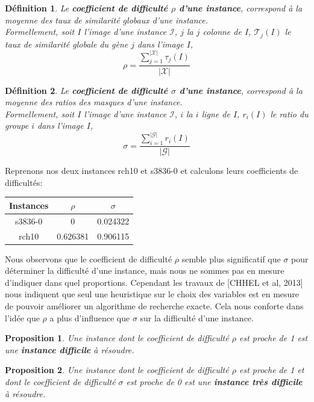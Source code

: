 \documentclass[a4paper,10pt]{article}
\newtheorem{definition}{Définition}
\newtheorem{proposition}{Proposition}
\begin{document}
\begin{definition}
Le \textbf{coefficient de difficulté $\rho$ d'une instance}, correspond à la moyenne des taux de similarité globaux d'une instance.\\
Formellement, soit $I$ l'image d'une instance $\mathcal{I}$, $j$ la $j$ colonne de $I$, $\mathcal{T}_j(I)$ le taux de similarité globale du gène $j$ dans l'image $I$,
$$ \rho=\frac{\sum_{j=1}^{|\mathcal{X}|}\tau_j(I)}{|\mathcal{X}|} $$
\end{definition}

\begin{definition}
Le \textbf{coefficient de difficulté $\sigma$ d'une instance}, correspond à la moyenne des ratios des masques d'une instance.\\
Formellement, soit $I$ l'image d'une instance $\mathcal{I}$, $i$ la $i$ ligne de $I$, $r_i(I)$ le ratio du groupe $i$ dans l'image $I$,
$$ \sigma=\frac{\sum_{i=1}^{|\mathcal{G}|}r_i(I)} {|\mathcal{G}|} $$
\end{definition}

Reprenons nos deux instances rch10 et s3836-0 et calculons leurs coefficients de difficultés:

\begin{center}
\begin{tabular}{|c|c|c|}
\hline 
Instances & $\rho$ & $\sigma$ \\ 
\hline 
s3836-0 & 0 & 0.024322 \\ 
\hline
rch10 & 0.626381 & 0.906115 \\ 
\hline
\end{tabular} 
\end{center}

Nous observons que le coefficient de difficulté $\rho$ semble plus significatif que $\sigma$ pour déterminer la difficulté d'une instance, mais nous ne sommes pas en mesure d'indiquer dans quel proportions. Cependant les travaux de [CHHEL et al, 2013] nous indiquent que seul une heuristique sur le choix des variables est en mesure de pouvoir améliorer un algorithme de recherche exacte. Cela nous conforte dans l'idée que $\rho$ a plus d'influence que $\sigma$ sur la difficulté d'une instance. 

\begin{proposition}
Une instance dont le coefficient de difficulté $\rho$ est proche de 1 est une \textbf{instance difficile} à résoudre.
\end{proposition}

\begin{proposition}
Une instance dont le coefficient de difficulté $\rho$ est proche de 1 et dont le coefficient de difficulté $\sigma$ est proche de 0 est une \textbf{instance très difficile} à résoudre.
\end{proposition}
\end{document}
